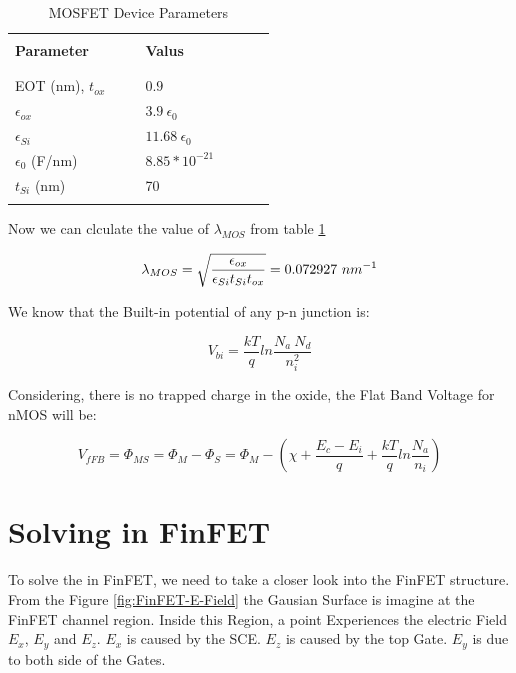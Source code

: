 \documentclass[a4paper]{article}
\begin{document}
\begin{table}[!h]
  \caption{MOSFET Device Parameters}
  \label{tab:MOS-device-table}
  \centering
  \begin{tabular}{p{0.4\linewidth} p{0.4\linewidth} }
    \hline
    \hline
     & \\
    \textbf{Parameter} & \textbf{Valus}\\
     & \\
    \hline
    & \\
    EOT (nm), $t_{ox}$ \cite{web:ITRS} & $0.9$\\
    $\epsilon_{ox}$ & $3.9~\epsilon_0$\\
    $\epsilon_{Si}$ & $11.68~\epsilon_0$\\
    $\epsilon_0$ (F/nm) & $8.85 \ast 10^{-21}$\\
    $t_{Si}$ (nm) & 70\\
     & \\
    \hline
    \hline
  \end{tabular}
\end{table}

Now we can clculate the value of $\lambda_{MOS}$ from table \ref{tab:MOS-device-table}

\begin{equation}
  \lambda_{MOS} = \sqrt{{\frac{\epsilon_{ox}}{\epsilon_{Si}t_{Si}t_{ox}}}} =  0.072927~nm^{-1}
\end{equation}

We know that the Built-in potential of any p-n junction is:

\begin{equation}
  V_{bi} = \frac{kT}{q} ln\frac{N_{a}~N_{d}}{n_i^2}
\end{equation}

Considering, there is no trapped charge in the oxide, the Flat Band Voltage for nMOS will be:

\begin{equation}
  V_{fFB} = \Phi_{MS} = \Phi_M - \Phi_S = \Phi_M - \left( \chi + \frac{E_c - E_i}{q} + \frac{kT}{q}ln\frac{N_a}{n_i} \right)
\end{equation}

\section{Solving \PE in FinFET}

To solve the \PE in FinFET, we need to take a closer look into the FinFET structure. From the Figure \ref{fig:FinFET-E-Field} the Gausian Surface is imagine at the FinFET channel region. Inside this Region, a point Experiences the electric Field $E_x$, $E_y$ and $E_z$. $E_x$ is caused by the SCE. $E_z$ is caused by the top Gate. $E_y$ is due to both side of the Gates.
\end{document}
